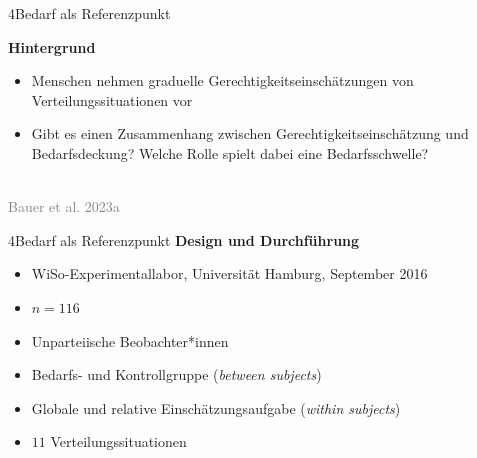 \documentclass[xcolor=table,9pt,aspectratio=169]{beamer}
\begin{document}
\begin{frame}{\vspace*{10mm}4\hspace*{1em}Bedarf als Referenzpunkt}
\begin{multicols}{2}
   \textbf{Hintergrund}\\
   \medskip
   \begin{itemize}
      \item Menschen nehmen graduelle Gerechtigkeitseinschätzungen von Verteilungssituationen vor
      \item Gibt es einen Zusammenhang zwischen Gerechtigkeitseinschätzung und Bedarfsdeckung? Welche Rolle spielt dabei eine Bedarfsschwelle?
   \end{itemize}
   \vfill
   \begin{center}
      \\
      \textcolor{gray}{Bauer et al. 2023a}
   \end{center}
\end{multicols}
\end{frame}


\begin{frame}{\vspace*{10mm}4\hspace*{1em}Bedarf als Referenzpunkt}
\textbf{Design und Durchführung}\\
\medskip
\begin{itemize}
   \item WiSo-Experimentallabor, Universität Hamburg, September 2016
   \item $n=116$
   \item Unparteiische Beobachter*innen
   \item Bedarfs- und Kontrollgruppe (\textit{between subjects})
   \item Globale und relative Einschätzungsaufgabe (\textit{within subjects})
   \item $11$ Verteilungssituationen
\end{itemize}
\end{frame}
\end{document}
